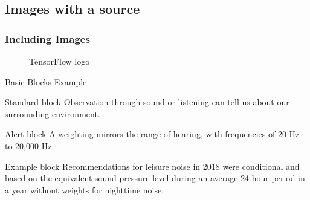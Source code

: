 \subsection{Images with a source}
\begin{frame}
	\frametitle{Including Images}
	\begin{figure}
		\centering
		\caption{TensorFlow logo}
	\end{figure}
\end{frame}

\begin{frame}{Basic Blocks Example}
	\begin{block}{Standard block}
		Observation through sound or listening can tell us about our surrounding environment.
	\end{block}
	\begin{alertblock}{Alert block}
		A-weighting mirrors the range of hearing, with frequencies of 20 Hz to 20,000 Hz.
	\end{alertblock}
	\begin{exampleblock}{Example block}
		Recommendations for leisure noise in 2018 were conditional and based on the equivalent sound pressure level during an average 24 hour period in a year without weights for nighttime noise.
	\end{exampleblock}
\end{frame}
\fi


